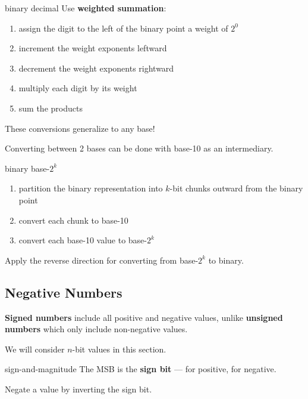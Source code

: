 \begin{defn}{binary \to decimal}
    Use \textbf{weighted summation}:
    \begin{enumerate}
        \item assign the digit to the left of the binary point a weight of $2^0$
        \item increment the weight exponents leftward 
        \item decrement the weight exponents rightward
        \item multiply each digit by its weight
        \item sum the products
    \end{enumerate}
\end{defn}

These conversions generalize to any base!

Converting between 2 bases can be done with base-10 as an intermediary.

\begin{defn*}{binary \convert base-$2^k$}
    \begin{enumerate}
        \item partition the binary representation into $k$-bit chunks outward from the binary point
        \item convert each chunk to base-10
        \item convert each base-10 value to base-$2^k$
    \end{enumerate}

    Apply the reverse direction for converting from base-$2^k$ to binary.
\end{defn*}

\subsection{Negative Numbers}
\textbf{Signed numbers} include all positive and negative values, unlike \textbf{unsigned numbers} which
only include non-negative values.

We will consider $n$-bit values in this section.

\begin{defn}{sign-and-magnitude}
    The MSB is the \textbf{sign bit} ---  for positive,  for negative.

    Negate a value by inverting the sign bit.

    \begin{itemize}
    \end{itemize}
\end{defn}

